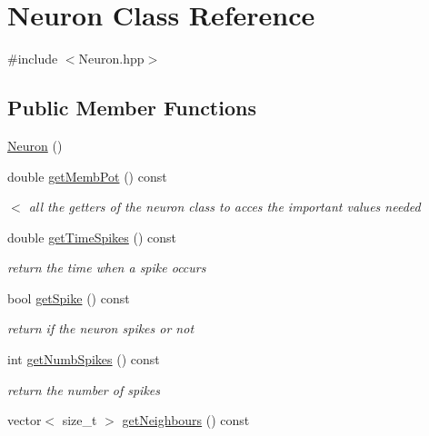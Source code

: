 \hypertarget{classNeuron}{\section{Neuron Class Reference}
\label{classNeuron}
}


{\ttfamily \#include $<$Neuron.\-hpp$>$}

\subsection*{Public Member Functions}
\begin{DoxyCompactItemize}
\item 
\hyperlink{classNeuron_a823487d01615fadb8ac19a2768dd9d96}{Neuron} ()
\item 
double \hyperlink{classNeuron_a2d5813a910d37557ab9ff24d04d75a4f}{get\-Memb\-Pot} () const 
\begin{DoxyCompactList}\small\item\em $<$ all the getters of the neuron class to acces the important values needed \end{DoxyCompactList}\item 
\hypertarget{classNeuron_a13b7bf51bf586b16137dd16cf746d05d}{double \hyperlink{classNeuron_a13b7bf51bf586b16137dd16cf746d05d}{get\-Time\-Spikes} () const }\label{classNeuron_a13b7bf51bf586b16137dd16cf746d05d}

\begin{DoxyCompactList}\small\item\em return the time when a spike occurs \end{DoxyCompactList}\item 
\hypertarget{classNeuron_a9c7aefda240dcf3ebdfc946c4e5925d7}{bool \hyperlink{classNeuron_a9c7aefda240dcf3ebdfc946c4e5925d7}{get\-Spike} () const }\label{classNeuron_a9c7aefda240dcf3ebdfc946c4e5925d7}

\begin{DoxyCompactList}\small\item\em return if the neuron spikes or not \end{DoxyCompactList}\item 
\hypertarget{classNeuron_ae68be71d47b724a7f7f3121712cdc9fc}{int \hyperlink{classNeuron_ae68be71d47b724a7f7f3121712cdc9fc}{get\-Numb\-Spikes} () const }\label{classNeuron_ae68be71d47b724a7f7f3121712cdc9fc}

\begin{DoxyCompactList}\small\item\em return the number of spikes \end{DoxyCompactList}\item 
\hypertarget{classNeuron_a4df5e8822dc8a6d95cff556bd31fe471}{vector$<$ size\-\_\-t $>$ \hyperlink{classNeuron_a4df5e8822dc8a6d95cff556bd31fe471}{get\-Neighbours} () const }\label{classNeuron_a4df5e8822dc8a6d95cff556bd31fe471}


\end{DoxyCompactItemize}
